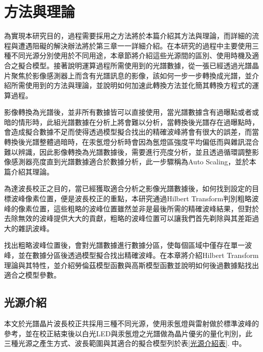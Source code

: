 \titlespacing{\chapter}{0cm}{-2cm}{0cm}
\chapter{方法與理論}
為實現本研究目的，過程需要採用之方法將於本篇介紹其方法與理論，而詳細的流程與遭遇阻礙的解決辦法將於第三章一一詳細介紹。在本研究的過程中主要使用三種不同光源分別使用於不同用途，本章節將介紹這些光源間的區別、使用時機及適合之擬合模型。接著說明運算過程所需使用到的光譜數據，從一張已經透過光譜晶片聚焦於影像感測器上而含有光譜訊息的影像，該如何一步一步轉換成光譜，並介紹所需使用到的方法與理論，並說明如何加速此轉換方法並化簡其轉換方程式的運算過程。
\par
影像轉換為光譜後，並非所有數據皆可以直接使用，當光譜數據含有過曝點或者或暗的情形時，此組光譜數據在分析上將會難以分析，當轉換後光譜存在過曝點時，會造成擬合數據不足而使得透過模型擬合找出的精確波峰將會有很大的誤差，而當轉換後光譜整體過暗時，在汞氬燈分析時會因為氬燈區強度平均偏低而與雜訊混合難以辨識，因此影像轉換為光譜數據後，需要進行亮度分析，並且透過循環調整影像感測器亮度直到光譜數據適合於數據分析，此一步驟稱為Auto Scaling，並於本篇介紹其理論。
\par
為達波長校正之目的，當已經獲取適合分析之影像光譜數據後，如何找到設定的目標波峰像素位置，便是波長校正的重點，本研究通過Hilbert Transform判別粗略波峰的像素位置，這些粗略的波峰位置雖然並非是最後所需的精確波峰結果，但對於去除無效的波峰提供大大的貢獻，粗略的波峰位置可以讓我們首先剃除與其差距過大的雜訊波峰。
\par
找出粗略波峰位置後，會對光譜數據進行數據分區，使每個區域中僅存在單一波峰，並在數據分區後透過模型擬合找出精確波峰。在本章將介紹Hilbert Transform理論與其特性，並介紹勞倫茲模型函數與高斯模型函數並說明如何後過數據點找出適合之模型參數。
\section{光源介紹}
本文於光譜晶片波長校正共採用三種不同光源，使用汞氬燈與雷射做於標準波峰的參考，並在校正結束後以白光LED\cite{White-LED}與汞氬燈之光譜做為晶片優劣的量化判別，此三種光源之產生方式、波長範圍與其適合的擬合模型列於表\ref{光源介紹表}. 中。

